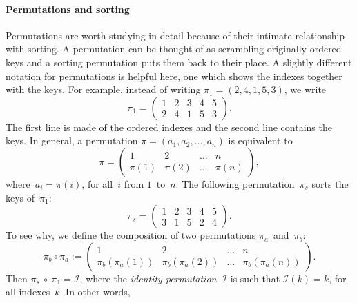 \paragraph{Permutations and sorting}

Permutations are worth studying in detail because
of their intimate relationship with sorting. A permutation can be
thought of as scrambling originally ordered keys and a sorting
permutation puts them back to their place. A slightly different
notation for permutations is helpful here, one which shows the indexes
together with the keys. For example, instead of writing \(\pi_1 =
(2,4,1,5,3)\), we write
\begin{equation*}
\pi_1 =
\begin{pmatrix}
1 & 2 & 3 & 4 & 5\\
2 & 4 & 1 & 5 & 3
\end{pmatrix}.
\end{equation*}
The first line is made of the ordered indexes and the second line
contains the keys. In general, a permutation \(\pi =
(a_1,a_2,\dots,a_n)\) is equivalent to
\begin{equation*}
\pi =
\begin{pmatrix}
     1 &      2 & \dots &     n\\
\pi(1) & \pi(2) & \dots & \pi(n)
\end{pmatrix},
\end{equation*}
where~\(a_i = \pi(i)\), for all~\(i\) from \(1\)~to~\(n\). The
following permutation~\(\pi_s\) sorts the keys of~\(\pi_1\):
\begin{equation*}
\pi_s =
\begin{pmatrix}
1 & 2 & 3 & 4 & 5\\
3 & 1 & 5 & 2 & 4
\end{pmatrix}.
\end{equation*}
To see why, we define the composition
of two permutations \(\pi_a\)~and~\(\pi_b\):
\begin{equation*}
\pi_b \circ \pi_a :=
\begin{pmatrix}
              1 &               2 & \dots & n\\
\pi_b(\pi_a(1)) & \pi_b(\pi_a(2)) & \dots & \pi_b(\pi_a(n))
\end{pmatrix}.
\end{equation*}
Then \(\pi_s~\circ~\pi_1 = \mathcal{I}\), where the \emph{identity
  permutation}~\(\mathcal{I}\) is such
that \(\mathcal{I}(k) = k\), for all indexes~\(k\). In other words,
